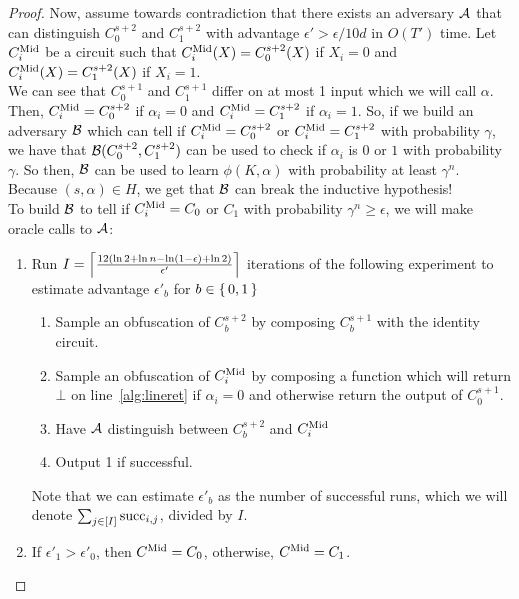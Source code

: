 \begin{lemma}
\begin{proof}
		Now, assume towards contradiction that there exists an adversary $\mathcal{A}$ that can distinguish $C_0^{s + 2}$ and $C_1^{s + 2}$ with advantage $\epsilon' > \epsilon / 10d$
		in $O(T')$ time.
		Let $C^{\text{Mid}}_i$ be a circuit such that $C^{\text{Mid}}_i(X) = C_0^{s + 2}(X)$ if $X_i = 0$ and $C^{\text{Mid}}_i(X) = C_1^{s + 2}(X)$ if $X_i = 1$.\\
		We can see that $C_0^{s + 1}$ and $C_1^{s + 1}$ differ on at most 1 input which we will call $\alpha$. %
		Then, $C^{\text{Mid}}_i = C_0^{s + 2}$ if $\alpha_i = 0$ and $C^{\text{Mid}}_i = C_1^{s + 2}$ if $\alpha_i = 1$.
		So, if we build an adversary $\mathcal{B}$ which can tell if $C^{\text{Mid}}_i = C_0^{s + 2}$ or $C^{\text{Mid}}_i = C_1^{s + 2}$ with probability $\gamma$,
		we have that $\mathcal{B}(C_0^{s + 2}, C_1^{s + 2})$ can be used to check if $\alpha_i$ is $0$ or $1$ with probability $\gamma$.
		So then, $\mathcal{B}$ can be used to learn $\phi(K, \alpha)$ with probability at least $\gamma^n$.
		Because $(s, \alpha) \in H$, we get that $\mathcal{B}$ can break the inductive hypothesis!\\
		\linebreak
		To build $\mathcal{B}$ to tell if $C^{\text{Mid}}_i = C_0$ or $C_1$ with probability $\gamma^n \geq \epsilon$, we will make oracle calls to $\mathcal{A}$:
		\begin{enumerate}
			\item Run $I =\left\lceil 
			\frac{12\left(\ln 2 + \ln n - \ln\left(1 - \epsilon\right) + \ln 2\right)}{\epsilon'} \right\rceil$ iterations of the following experiment to estimate advantage $\epsilon'_b$ for $b \in \set{0, 1}$
				\begin{enumerate}
					\item Sample an obfuscation of $C_b^{s + 2}$ by composing $C_b^{s + 1}$ with the identity circuit.
					\item Sample an obfuscation of $C^{\text{Mid}}_i$ by composing a function which will return $\bot$ on line~\ref{alg:lineret} if $\alpha_i = 0$ and otherwise return the output of $C_0^{s + 1}$.
					\item Have $\mathcal{A}$ distinguish between $C_b^{s + 2}$ and $C^{\text{Mid}}_i$
					\item Output 1 if successful.
				\end{enumerate}
			Note that we can estimate $\epsilon'_b$ as the number of successful runs, which we will denote $\sum_{j \in [I]} \text{succ}_{i, j}$, divided by $I$.
			\item If $\epsilon'_1 > \epsilon'_0$, then $C^{\text{Mid}} = C_0$, otherwise, $C^{\text{Mid}} = C_1$.
		\end{enumerate}


\end{proof}
\end{lemma}
